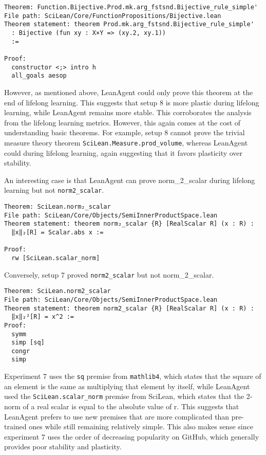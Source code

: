 \documentclass{article} %
\begin{document}
\begin{verbatim}
Theorem: Function.Bijective.Prod.mk.arg_fstsnd.Bijective_rule_simple'
File path: SciLean/Core/FunctionPropositions/Bijective.lean
Theorem statement: theorem Prod.mk.arg_fstsnd.Bijective_rule_simple'
  : Bijective (fun xy : X×Y => (xy.2, xy.1))
  :=

Proof:
  constructor <;> intro h
  all_goals aesop
\end{verbatim}

However, as mentioned above, LeanAgent could only prove this theorem at the end of lifelong learning. This suggests that setup 8 is more plastic during lifelong learning, while LeanAgent remains more stable. This corroborates the analysis from the lifelong learning metrics. However, this again comes at the cost of understanding basic theorems. For example, setup 8 cannot prove the trivial measure theory theorem \texttt{SciLean.Measure.prod\_volume}, whereas LeanAgent could during lifelong learning, again suggesting that it favors plasticity over stability.

An interesting case is that LeanAgent can prove norm_{2}\_scalar during lifelong learning but not \texttt{norm2\_scalar}.

\begin{verbatim}
Theorem: SciLean.norm₂_scalar
File path: SciLean/Core/Objects/SemiInnerProductSpace.lean
Theorem statement: theorem norm₂_scalar {R} [RealScalar R] (x : R) :
  ‖x‖₂[R] = Scalar.abs x :=

Proof:
  rw [SciLean.scalar_norm]
\end{verbatim}

Conversely, setup 7 proved \texttt{norm2\_scalar} but not norm_{2}\_scalar. 

\begin{verbatim}
Theorem: SciLean.norm2_scalar
File path: SciLean/Core/Objects/SemiInnerProductSpace.lean
Theorem statement: theorem norm2_scalar {R} [RealScalar R] (x : R) :
  ‖x‖₂²[R] = x^2 :=
Proof:
  symm
  simp [sq]
  congr
  simp
\end{verbatim}

Experiment 7 uses the \texttt{sq} premise from \texttt{mathlib4}, which states that the square of an element is the same as multiplying that element by itself, while LeanAgent used the \texttt{SciLean.scalar\_norm} premise from SciLean, which states that the 2-norm of a real scalar is equal to the absolute value of r. This suggests that LeanAgent prefers to use new premises that are more complicated than pre-trained ones while still remaining relatively simple. This also makes sense since experiment 7 uses the order of decreasing popularity on GitHub, which generally provides poor stability and plasticity.
\end{document}
